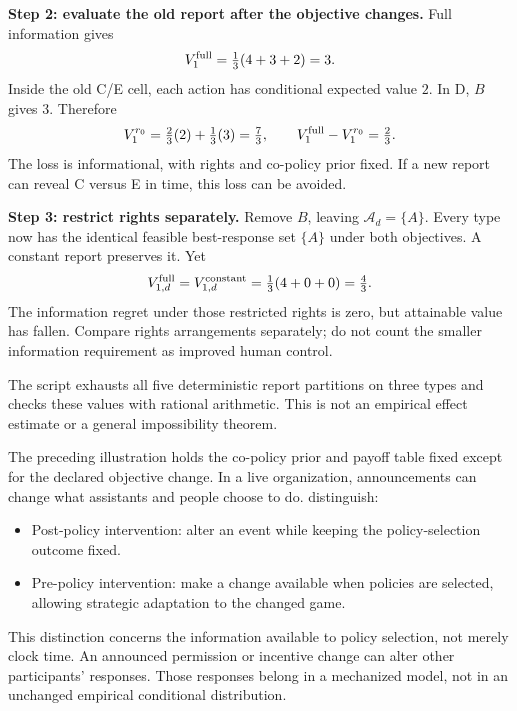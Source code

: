 \documentclass[11pt,letterpaper]{article}
\begin{document}
\textbf{Step 2: evaluate the old report after the objective changes.} Full information gives
\begin{equation}
 V_1^{\rm full}=\tfrac13(4+3+2)=3.
\end{equation}
Inside the old C/E cell, each action has conditional expected value $2$. In D, $B$ gives $3$. Therefore
\begin{equation}
 V_1^{r_0}=\tfrac23(2)+\tfrac13(3)=\tfrac73,
 \qquad V_1^{\rm full}-V_1^{r_0}=\tfrac23.
\end{equation}
The loss is informational, with rights and co-policy prior fixed. If a new report can reveal C versus E in time, this loss can be avoided.

\textbf{Step 3: restrict rights separately.} Remove $B$, leaving $\mathcal A_d=\{A\}$. Every type now has the identical feasible best-response set $\{A\}$ under both objectives. A constant report preserves it. Yet
\begin{equation}
 V_{1,d}^{\rm full}=V_{1,d}^{\rm constant}=\tfrac13(4+0+0)=\tfrac43.
\end{equation}
The information regret under those restricted rights is zero, but attainable value has fallen. Compare rights arrangements separately; do not count the smaller information requirement as improved human control.

The script \citep{tanwisuth2026strategic} exhausts all five deterministic report partitions on three types and checks these values with rational arithmetic. This is not an empirical effect estimate or a general impossibility theorem.

The preceding illustration holds the co-policy prior and payoff table fixed except for the declared objective change. In a live organization, announcements can change what assistants and people choose to do. \citet[PDF pp. 15--17]{hammond2023games} distinguish:
\begin{itemize}
\item Post-policy intervention: alter an event while keeping the policy-selection outcome fixed.
\item Pre-policy intervention: make a change available when policies are selected, allowing strategic adaptation to the changed game.
\end{itemize}
This distinction concerns the information available to policy selection, not merely clock time. An announced permission or incentive change can alter other participants' responses. Those responses belong in a mechanized model, not in an unchanged empirical conditional distribution.
\end{document}
